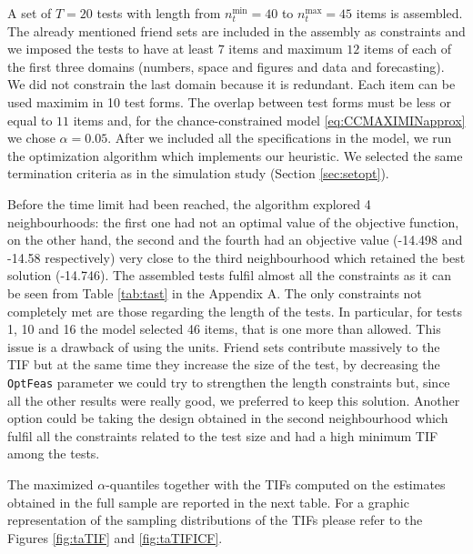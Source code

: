A set of $T=20$ tests with length from $n^{\min}_t=40$ to $n^{\max}_t=45$ items is assembled. The already mentioned friend sets are included in the assembly as constraints and we imposed the tests to have at least $7$ items and maximum $12$ items of each of the first three domains (numbers, space and figures and data and forecasting). We did not constrain the last domain because it is redundant. Each item can be used maximim in 10 test forms.
The overlap between test forms must be less or equal to $11$ items and, for the chance-constrained model \eqref{eq:CCMAXIMINapprox} we chose $\alpha=0.05$.
After we included all the specifications in the model, we run the optimization algorithm which implements our heuristic. We selected the same termination criteria as in the simulation study (Section \ref{sec:setopt}). 

Before the time limit had been reached, the algorithm explored 4 neighbourhoods: the first one had not an optimal value of the objective function, on the other hand, the second and the fourth had an objective value (-14.498 and -14.58 respectively) very close to the third neighbourhood which retained the best solution (-14.746). The assembled tests fulfil almost all the constraints as it can be seen from Table \ref{tab:tast} in the Appendix A. The only constraints not completely met are those regarding the length of the tests. In particular, for tests 1, 10 and 16 the model selected 46 items, that is one more than allowed. This issue is a drawback of using the units. Friend sets contribute massively to the TIF but at the same time they increase the size of the test, by decreasing the \texttt{OptFeas} parameter we could try to strengthen the length constraints but, since all the other results were really good, we preferred to keep this solution. Another option could be taking the design obtained in the second neighbourhood which fulfil all the constraints related to the test size and had a high minimum TIF among the tests.

The maximized $\alpha$-quantiles together with the TIFs computed on the estimates obtained in the full sample are reported in the next table. For a graphic representation of the sampling distributions of the TIFs please refer to the Figures \ref{fig:taTIF} and \ref{fig:taTIFICF}.

